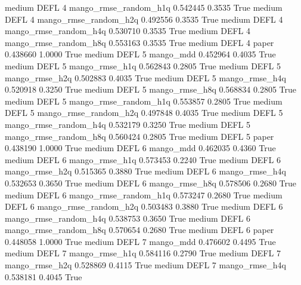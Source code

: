     medium     DEFL                 4 mango_rmse_random_h1q   0.542445      0.3535    True
    medium     DEFL                 4 mango_rmse_random_h2q   0.492556      0.3535    True
    medium     DEFL                 4 mango_rmse_random_h4q   0.530710      0.3535    True
    medium     DEFL                 4 mango_rmse_random_h8q   0.553163      0.3535    True
    medium     DEFL                 4                 paper   0.438660      1.0000    True
    medium     DEFL                 5             mango_mdd   0.452964      0.4035    True
    medium     DEFL                 5        mango_rmse_h1q   0.562843      0.2805    True
    medium     DEFL                 5        mango_rmse_h2q   0.502883      0.4035    True
    medium     DEFL                 5        mango_rmse_h4q   0.520918      0.3250    True
    medium     DEFL                 5        mango_rmse_h8q   0.568834      0.2805    True
    medium     DEFL                 5 mango_rmse_random_h1q   0.553857      0.2805    True
    medium     DEFL                 5 mango_rmse_random_h2q   0.497848      0.4035    True
    medium     DEFL                 5 mango_rmse_random_h4q   0.532179      0.3250    True
    medium     DEFL                 5 mango_rmse_random_h8q   0.560424      0.2805    True
    medium     DEFL                 5                 paper   0.438190      1.0000    True
    medium     DEFL                 6             mango_mdd   0.462035      0.4360    True
    medium     DEFL                 6        mango_rmse_h1q   0.573453      0.2240    True
    medium     DEFL                 6        mango_rmse_h2q   0.515365      0.3880    True
    medium     DEFL                 6        mango_rmse_h4q   0.532653      0.3650    True
    medium     DEFL                 6        mango_rmse_h8q   0.578506      0.2680    True
    medium     DEFL                 6 mango_rmse_random_h1q   0.573247      0.2680    True
    medium     DEFL                 6 mango_rmse_random_h2q   0.503483      0.3880    True
    medium     DEFL                 6 mango_rmse_random_h4q   0.538753      0.3650    True
    medium     DEFL                 6 mango_rmse_random_h8q   0.570654      0.2680    True
    medium     DEFL                 6                 paper   0.448058      1.0000    True
    medium     DEFL                 7             mango_mdd   0.476602      0.4495    True
    medium     DEFL                 7        mango_rmse_h1q   0.584116      0.2790    True
    medium     DEFL                 7        mango_rmse_h2q   0.528869      0.4115    True
    medium     DEFL                 7        mango_rmse_h4q   0.538181      0.4045    True
